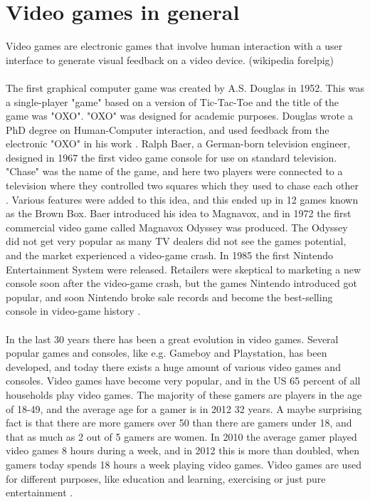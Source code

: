 \section{Video games in general}
Video games are electronic games that involve human interaction with a user interface to generate visual feedback on a video device. (wikipedia forelpig)\\ \\
The first graphical computer game was created by A.S. Douglas in 1952. This was a single-player "game" based on a version of Tic-Tac-Toe and the title of the game was "OXO". "OXO" was designed for academic purposes.  Douglas wrote a PhD degree on Human-Computer interaction, and used feedback from the electronic "OXO" in his work \cite{abouthiginbotham}. Ralph Baer, a German-born television engineer, designed in 1967 the first video game console for use on standard television. "Chase" was the name of the game, and here two players were connected to a television where they controlled two squares which they used to chase each other \cite{videogameHistory}. Various features were added to this idea, and this ended up in 12 games known as the Brown Box. Baer introduced his idea to Magnavox, and in 1972 the first commercial video game called Magnavox Odyssey was produced. The Odyssey did not get very popular as many TV dealers did not see the games potential, and the market experienced a video-game crash.  In 1985 the first Nintendo Entertainment System were released. Retailers were skeptical to marketing a new console soon after the video-game crash, but the games Nintendo introduced got popular, and soon Nintendo broke sale records and become the best-selling console in video-game history \cite{consoleHistory}. \\ \\
In the last 30 years there has been a great evolution in video games. Several popular games and consoles, like e.g. Gameboy and Playstation, has been developed, and today there exists a huge amount of various video games and consoles. Video games have become very popular, and in the US 65 percent of all households play video games. The majority of these gamers are players in the age of 18-49, and the average age for a gamer is in 2012 32 years. A maybe surprising fact is that there are more gamers over 50 than there are gamers under 18, and that as much as 2 out of 5 gamers are women. In 2010 the average gamer played video games 8 hours during a week, and in 2012 this is more than doubled, when gamers today spends 18 hours a week playing video games.  Video games are used for different purposes, like education and learning, exercising or just pure entertainment \cite{statistics2010} \cite{statistics2012}. \\ \\
